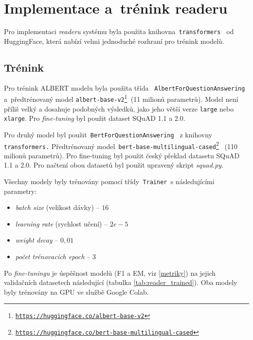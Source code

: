 \section{Implementace a~trénink readeru}
\label{reader_imp}
Pro implementaci \emph{readeru} systému byla použita knihovna\texttt{ transformers } od HuggingFace, která nabízí velmi jednoduché rozhraní pro trénink modelů.\par

\subsection{Trénink}
Pro trénink ALBERT modelu byla použita třída \texttt{ AlbertForQuestionAnswering } a~předtrénovaný model \texttt{albert-base-v2\footnote{\url{https://huggingface.co/albert-base-v2}} }(11 milionů parametrů). Model není příliš velký a dosahuje podobných výsledků, jako jeho větší verze \texttt{large} nebo \texttt{xlarge}. Pro \emph{fine-tuning} byl použit dataset SQuAD 1.1 a 2.0.\par
Pro druhý model byl použit\texttt{ BertForQuestionAnswering } z knihovny\texttt{ transformers.} Předtrénovaný model\texttt{ bert-base-multilingual-cased\footnote{\url{https://huggingface.co/bert-base-multilingual-cased}} } (110 milionů parametrů). Pro fine-tuning byl použit český překlad datasetu SQuAD 1.1 a 2.0. Pro načtení obou datasetů byl použit upravený skript \emph{squad.py}.\par
Všechny modely byly trénovány pomocí třídy\texttt{ Trainer }s následujícími parametry:
\begin{itemize}
    \item \emph{batch size} (velikost dávky) -- $16$
    \item \emph{learning rate} (rychlost učení) -- $2e\!-\!5$
    \item \emph{weight decay} -- $0,01$
    \item \emph{počet trénovacích epoch} -- $3$
\end{itemize}

Po \emph{fine-tuningu} je úspěšnost modelů (F1 a EM, viz \ref{metriky}) na jejich validačních datasetech následující (tabulka \ref{tab:reader_trained}). Oba modely byly trénovány na GPU ve službě Google Colab.


